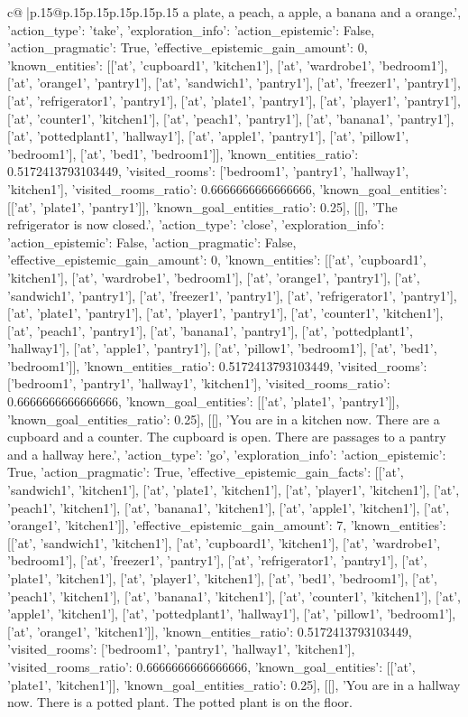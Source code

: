 \documentclass{article}
\begin{document}
{\begin{supertabular}{c@{$\;$}|p{.15\linewidth}@{}p{.15\linewidth}p{.15\linewidth}p{.15\linewidth}p{.15\linewidth}p{.15\linewidth}}
{{{a plate, a peach, a apple, a banana and a orange.\n', {'action_type': 'take', 'exploration_info': {'action_epistemic': False, 'action_pragmatic': True, 'effective_epistemic_gain_amount': 0, 'known_entities': [['at', 'cupboard1', 'kitchen1'], ['at', 'wardrobe1', 'bedroom1'], ['at', 'orange1', 'pantry1'], ['at', 'sandwich1', 'pantry1'], ['at', 'freezer1', 'pantry1'], ['at', 'refrigerator1', 'pantry1'], ['at', 'plate1', 'pantry1'], ['at', 'player1', 'pantry1'], ['at', 'counter1', 'kitchen1'], ['at', 'peach1', 'pantry1'], ['at', 'banana1', 'pantry1'], ['at', 'pottedplant1', 'hallway1'], ['at', 'apple1', 'pantry1'], ['at', 'pillow1', 'bedroom1'], ['at', 'bed1', 'bedroom1']], 'known_entities_ratio': 0.5172413793103449, 'visited_rooms': ['bedroom1', 'pantry1', 'hallway1', 'kitchen1'], 'visited_rooms_ratio': 0.6666666666666666, 'known_goal_entities': [['at', 'plate1', 'pantry1']], 'known_goal_entities_ratio': 0.25}}], [[], 'The refrigerator is now closed.\n', {'action_type': 'close', 'exploration_info': {'action_epistemic': False, 'action_pragmatic': False, 'effective_epistemic_gain_amount': 0, 'known_entities': [['at', 'cupboard1', 'kitchen1'], ['at', 'wardrobe1', 'bedroom1'], ['at', 'orange1', 'pantry1'], ['at', 'sandwich1', 'pantry1'], ['at', 'freezer1', 'pantry1'], ['at', 'refrigerator1', 'pantry1'], ['at', 'plate1', 'pantry1'], ['at', 'player1', 'pantry1'], ['at', 'counter1', 'kitchen1'], ['at', 'peach1', 'pantry1'], ['at', 'banana1', 'pantry1'], ['at', 'pottedplant1', 'hallway1'], ['at', 'apple1', 'pantry1'], ['at', 'pillow1', 'bedroom1'], ['at', 'bed1', 'bedroom1']], 'known_entities_ratio': 0.5172413793103449, 'visited_rooms': ['bedroom1', 'pantry1', 'hallway1', 'kitchen1'], 'visited_rooms_ratio': 0.6666666666666666, 'known_goal_entities': [['at', 'plate1', 'pantry1']], 'known_goal_entities_ratio': 0.25}}], [[], 'You are in a kitchen now. There are a cupboard and a counter. The cupboard is open. There are passages to a pantry and a hallway here.\n', {'action_type': 'go', 'exploration_info': {'action_epistemic': True, 'action_pragmatic': True, 'effective_epistemic_gain_facts': [['at', 'sandwich1', 'kitchen1'], ['at', 'plate1', 'kitchen1'], ['at', 'player1', 'kitchen1'], ['at', 'peach1', 'kitchen1'], ['at', 'banana1', 'kitchen1'], ['at', 'apple1', 'kitchen1'], ['at', 'orange1', 'kitchen1']], 'effective_epistemic_gain_amount': 7, 'known_entities': [['at', 'sandwich1', 'kitchen1'], ['at', 'cupboard1', 'kitchen1'], ['at', 'wardrobe1', 'bedroom1'], ['at', 'freezer1', 'pantry1'], ['at', 'refrigerator1', 'pantry1'], ['at', 'plate1', 'kitchen1'], ['at', 'player1', 'kitchen1'], ['at', 'bed1', 'bedroom1'], ['at', 'peach1', 'kitchen1'], ['at', 'banana1', 'kitchen1'], ['at', 'counter1', 'kitchen1'], ['at', 'apple1', 'kitchen1'], ['at', 'pottedplant1', 'hallway1'], ['at', 'pillow1', 'bedroom1'], ['at', 'orange1', 'kitchen1']], 'known_entities_ratio': 0.5172413793103449, 'visited_rooms': ['bedroom1', 'pantry1', 'hallway1', 'kitchen1'], 'visited_rooms_ratio': 0.6666666666666666, 'known_goal_entities': [['at', 'plate1', 'kitchen1']], 'known_goal_entities_ratio': 0.25}}], [[], 'You are in a hallway now. There is a potted plant. The potted plant is on the floor. }}}
\end{supertabular}}
\end{document}

